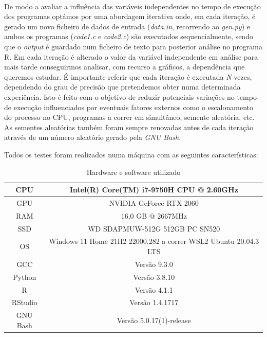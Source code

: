 \documentclass{article}
\begin{document}
\paragraph{}
De modo a avaliar a influência das variáveis independentes no tempo de execução dos programas optámos por uma abordagem iterativa onde, em cada iteração, é gerado um novo ficheiro de dados de entrada (\textit{data.in}, recorrendo ao \textit{gen.py}) e ambos os programas (\textit{code1.c} e \textit{code2.c}) são executados sequencialmente, sendo que o \textit{output} é guardado num ficheiro de texto para posterior análise no programa R. Em cada iteração é alterado o valor da variável independente em análise para mais tarde conseguirmos analisar, com recurso a gráficos, a dependência que queremos estudar. É importante referir que cada iteração é executada \textit{N} vezes, dependendo do grau de precisão que pretendemos obter numa determinada experiência. Isto é feito com o objetivo de reduzir potenciais variações no tempo de execução influenciados por eventuais fatores externos como o escalonamento do processo no CPU, programas a correr em simultâneo, semente aleatória, etc. As sementes aleatórias também foram sempre renovadas antes de cada iteração através de um número aleatório gerado pela \textit{GNU Bash}. \par
Todos os testes foram realizados numa máquina com as seguintes características:
\begin{table}[!htbp]
\begin{center} 
\begin{tabular}{ | c | c | } 
  \hline
  CPU & Intel(R) Core(TM) i7-9750H CPU @ 2.60GHz \\ 
  \hline
  GPU & NVIDIA GeForce RTX 2060 \\
  \hline
  RAM & 16,0 GB @ 2667MHz \\
  \hline
  SSD & WD SDAPMUW-512G 512GB PC SN520 \\
  \hline
  OS & Windows 11 Home 21H2 22000.282 a correr WSL2 Ubuntu 20.04.3 LTS\\
  \hline
  GCC & Versão 9.3.0\\
  \hline
  Python & Versão 3.8.10\\
  \hline
  R & Versão 4.1.1\\
  \hline
  RStudio & Versão 1.4.1717\\
  \hline
  GNU Bash & Versão 5.0.17(1)-release\\
  \hline
\end{tabular}
\caption{Hardware e software utilizado}
\end{center}
\end{table}
\end{document}

